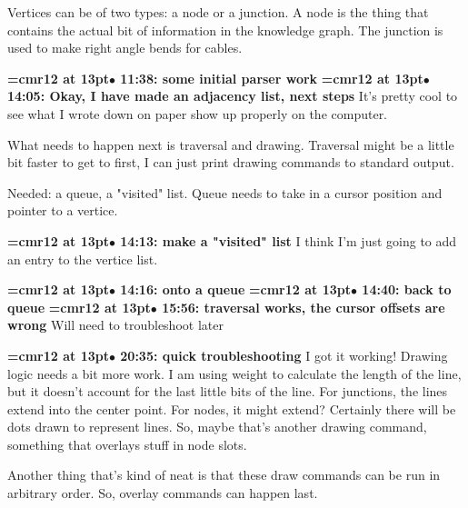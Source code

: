 Vertices can be of two types: a node or a junction. A node is the thing that contains the actual bit of information in the knowledge graph. The junction is used to make right angle bends for cables.
\par

{\smallskip\noindent\bf\font\titlefont=cmr12 at 13pt\titlefont $\bullet$ 11:38: some initial parser work}\smallskip
{\smallskip\noindent\bf\font\titlefont=cmr12 at 13pt\titlefont $\bullet$ 14:05: Okay, I have made an adjacency list, next steps}\smallskip
It's pretty cool to see what I wrote down on paper show up properly on the computer.
\par

What needs to happen next is traversal and drawing. Traversal might be a little bit faster to get to first, I can just print drawing commands to standard output.
\par

Needed: a queue, a "visited" list. Queue needs to take in a cursor position and pointer to a vertice.
\par

{\smallskip\noindent\bf\font\titlefont=cmr12 at 13pt\titlefont $\bullet$ 14:13: make a "visited" list}\smallskip
I think I'm just going to add an entry to the vertice list.
\par

{\smallskip\noindent\bf\font\titlefont=cmr12 at 13pt\titlefont $\bullet$ 14:16: onto a queue}\smallskip
{\smallskip\noindent\bf\font\titlefont=cmr12 at 13pt\titlefont $\bullet$ 14:40: back to queue}\smallskip
{\smallskip\noindent\bf\font\titlefont=cmr12 at 13pt\titlefont $\bullet$ 15:56: traversal works, the cursor offsets are wrong}\smallskip
Will need to troubleshoot later
\par

{\smallskip\noindent\bf\font\titlefont=cmr12 at 13pt\titlefont $\bullet$ 20:35: quick troubleshooting}\smallskip
I got it working! Drawing logic needs a bit more work. I am using weight to calculate the length of the line, but it doesn't account for the last little bits of the line. For junctions, the lines extend into the center point. For nodes, it might extend? Certainly there will be dots drawn to represent lines. So, maybe that's another drawing command, something that overlays stuff in node slots.
\par

Another thing that's kind of neat is that these draw commands can be run in arbitrary order. So, overlay commands can happen last.
\par

